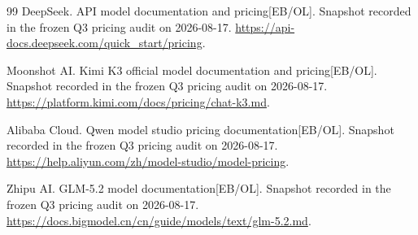 \begin{thebibliography}{99}
DeepSeek. API model documentation and pricing[EB/OL]. Snapshot recorded in the frozen Q3 pricing audit on 2026-08-17. \url{https://api-docs.deepseek.com/quick_start/pricing}.

Moonshot AI. Kimi K3 official model documentation and pricing[EB/OL]. Snapshot recorded in the frozen Q3 pricing audit on 2026-08-17. \url{https://platform.kimi.com/docs/pricing/chat-k3.md}.

Alibaba Cloud. Qwen model studio pricing documentation[EB/OL]. Snapshot recorded in the frozen Q3 pricing audit on 2026-08-17. \url{https://help.aliyun.com/zh/model-studio/model-pricing}.

Zhipu AI. GLM-5.2 model documentation[EB/OL]. Snapshot recorded in the frozen Q3 pricing audit on 2026-08-17. \url{https://docs.bigmodel.cn/cn/guide/models/text/glm-5.2.md}.

\end{thebibliography}
